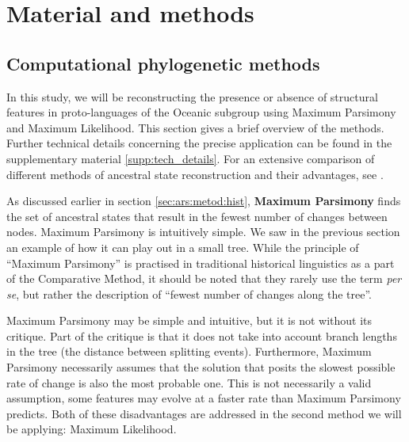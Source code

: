 \documentclass[a4paper,10pt]{article} %
\begin{document}

\section{Material and methods}
\subsection{Computational phylogenetic methods}
\label{sec:asr_methods}

In this study, we will be reconstructing the presence or absence of structural features in proto-languages of the Oceanic subgroup using Maximum Parsimony and Maximum Likelihood. This section gives a brief overview of the methods. Further technical details concerning the precise application can be found in the supplementary material \ref{supp:tech_details}. For an extensive comparison of different methods of ancestral state reconstruction and their advantages, see \citet{joy2016ancestral}.

As discussed earlier in section \ref{sec:ars:metod:hist}, \textbf{Maximum Parsimony} finds the set of ancestral states that result in the fewest number of changes between nodes. Maximum Parsimony is intuitively simple. We saw in the previous section an example of how it can play out in a small tree. While the principle of ``Maximum Parsimony'' is practised in traditional historical linguistics as a part of the Comparative Method, it should be noted that they rarely use the term \emph{per se}, but rather the description of ``fewest number of changes along the tree''.

Maximum Parsimony may be simple and intuitive, but it is not without its critique. Part of the critique is that it does not take into account branch lengths in the tree (the distance between splitting events). Furthermore, Maximum Parsimony necessarily assumes that the solution that posits the slowest possible rate of change is also the most probable one. This is not necessarily a valid assumption, some features may evolve at a faster rate than Maximum Parsimony predicts. Both of these disadvantages are addressed in the second method we will be applying: Maximum Likelihood.
\end{document}
